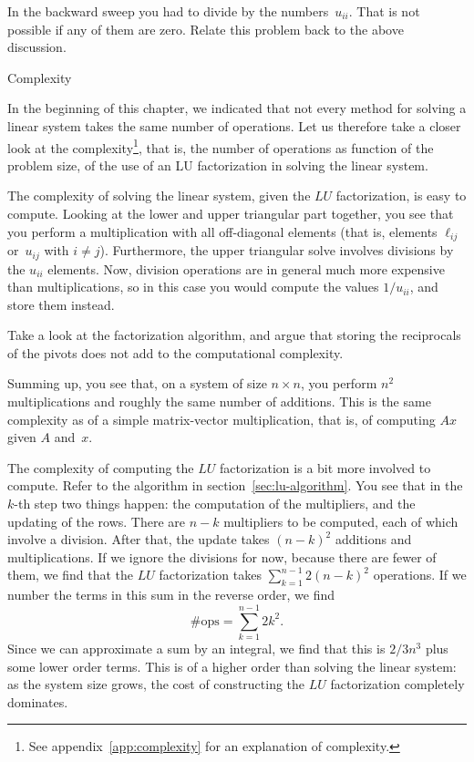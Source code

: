 \begin{exercise}
  In the backward sweep you had to divide by the
  numbers~$u_{ii}$. That is not possible if any of them are zero.
  Relate this problem back to the above discussion. 
\end{exercise}

 {Complexity}

In the beginning of this chapter, we indicated that not every method
for solving a linear system takes the same number of operations. Let
us therefore take a closer look at the complexity\footnote{See
  appendix~\ref{app:complexity} for an explanation of complexity.},
that is, the number of operations as function of the problem size, of
the use of an LU factorization in solving the linear system.

The complexity of solving the linear system, given the $LU$
factorization, is easy to compute. Looking at the lower and upper
triangular part together, you see that you perform a multiplication
with all off-diagonal elements (that is, elements $\ell_{ij}$
or~$u_{ij}$ with $i\not=j$). Furthermore, the upper triangular solve
involves divisions by the $u_{ii}$ elements. Now, division operations
are in general much more expensive than multiplications, so in this
case you would compute the values $1/u_{ii}$, and store them instead.

\begin{exercise}
  Take a look at the factorization algorithm, and argue that storing
  the reciprocals of the pivots does not add to the computational
  complexity.
\end{exercise}

Summing up, you see that, on a system of size $n\times n$, you perform
$n^2$ multiplications and roughly the same number of additions. This
is the same complexity as of a simple matrix-vector multiplication,
that is, of computing $Ax$ given $A$ and~$x$.

The complexity of computing the $LU$ factorization is a bit more
involved to compute. Refer to the algorithm in section~\ref{sec:lu-algorithm}.
You see that in the $k$-th step two things happen: the computation of
the multipliers, and the updating of the rows.
%
There are $n-k$ multipliers to be computed, each of which involve a
division. After that, the update takes $(n-k)^2$ additions and
multiplications. If we ignore the divisions for now, because there are
fewer of them, we find that the $LU$ factorization takes
$\sum_{k=1}^{n-1} 2(n-k)^2$
operations. If we number the terms in this sum in the reverse order,
we find \[ \#\mathrm{ops}=\sum_{k=1}^{n-1} 2k^2. \]
Since we can approximate a sum by an integral,
we find that this is $2/3n^3$ plus some lower
order terms. This is of a higher order than solving the linear system:
as the system size grows, the cost of constructing the $LU$
factorization completely dominates.


